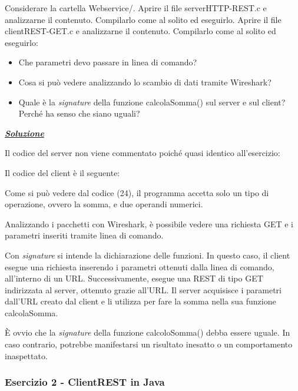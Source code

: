 \documentclass[a4paper]{article}
\begin{document}
	Considerare la cartella \textsf{Webservice/}. Aprire il file serverHTTP-REST.c e analizzarne il contenuto. Compilarlo come al solito ed eseguirlo. Aprire il file clientREST-GET.c e analizzarne il contenuto. Compilarlo come al solito ed eseguirlo:
	\begin{itemize}
		\item Che parametri devo passare in linea di comando?
		\item Cosa si può vedere analizzando lo scambio di dati tramite Wireshark?
		\item Quale è la \emph{signature} della funzione calcolaSomma() sul server e sul client? Perché ha senso che siano uguali?
	\end{itemize}
	
	\noindent
	\textcolor{Green4}{\underline{\textbf{\emph{Soluzione}}}}\newline
	
	\noindent
	Il codice del server non viene commentato poiché quasi identico all'esercizio:
	\newpage
	
	\noindent
	Il codice del client è il seguente:
	
	Come si può vedere dal codice (24), il programma accetta solo un tipo di operazione, ovvero la somma, e due operandi numerici.\newline
	
	\noindent
	Analizzando i pacchetti con Wireshark, è possibile vedere una richiesta GET e i parametri inseriti tramite linea di comando.\newline
	
	\noindent
	Con \emph{signature} si intende la dichiarazione delle funzioni. In questo caso, il client esegue una richiesta inserendo i parametri ottenuti dalla linea di comando, all'interno di un URL. Successivamente, esegue una REST di tipo GET indirizzata al server, ottenuto grazie all'URL. Il server acquisisce i parametri dall'URL creato dal client e li utilizza per fare la somma nella sua funzione \textsf{calcolaSomma}.
	
	È ovvio che la \emph{signature} della funzione \textsf{calcoloSomma()} debba essere uguale. In caso contrario, potrebbe manifestarsi un risultato inesatto o un comportamento inaspettato.\newpage
	
	\subsubsection{Esercizio 2 - \textsf{ClientREST} in Java}
	
\end{document}
